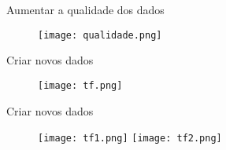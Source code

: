\begin{frame}[t]{Aumentar a qualidade dos dados}
    \begin{figure}

        \texttt{[image: qualidade.png]}
    
    \end{figure}
\end{frame}
\begin{frame}[t]{Criar novos dados}
    \begin{figure}

        \texttt{[image: tf.png]}
    
    \end{figure}
\end{frame}

\begin{frame}[t]{Criar novos dados}
    \begin{figure}

        \texttt{[image: tf1.png]}%
        \hfill
        \texttt{[image: tf2.png]}
    
    \end{figure}
\end{frame}



          
          
